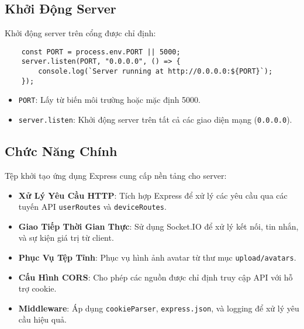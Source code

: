         \subsection{Khởi Động Server}
            \hspace*{0.6cm}Khởi động server trên cổng được chỉ định:
            \begin{lstlisting}
    const PORT = process.env.PORT || 5000;
    server.listen(PORT, "0.0.0.0", () => {
        console.log(`Server running at http://0.0.0.0:${PORT}`);
    });
            \end{lstlisting}
            \begin{itemize}
                \item \texttt{PORT}: Lấy từ biến môi trường hoặc mặc định 5000.
                \item \texttt{server.listen}: Khởi động server trên tất cả các giao diện mạng (\texttt{0.0.0.0}).
            \end{itemize}

        \subsection{Chức Năng Chính}
            \hspace*{0.6cm}Tệp khởi tạo ứng dụng Express cung cấp nền tảng cho server:
            \begin{itemize}
                \item \textbf{Xử Lý Yêu Cầu HTTP}: Tích hợp Express để xử lý các yêu cầu qua các tuyến API \texttt{userRoutes} và \texttt{deviceRoutes}.
                \item \textbf{Giao Tiếp Thời Gian Thực}: Sử dụng Socket.IO để xử lý kết nối, tin nhắn, và sự kiện giá trị từ client.
                \item \textbf{Phục Vụ Tệp Tĩnh}: Phục vụ hình ảnh avatar từ thư mục \texttt{upload/avatars}.
                \item \textbf{Cấu Hình CORS}: Cho phép các nguồn được chỉ định truy cập API với hỗ trợ cookie.
                \item \textbf{Middleware}: Áp dụng \texttt{cookieParser}, \texttt{express.json}, và logging để xử lý yêu cầu hiệu quả.
            \end{itemize}

